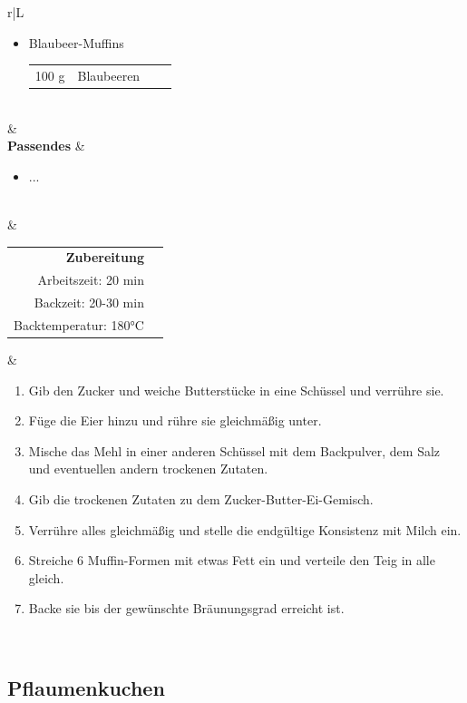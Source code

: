\documentclass[a4paper, 12pt]{scrbook} 								%
\numberwithin{equation}{section} 									%
\begin{document}
\begin{tabularx}{\textwidth}{r|L}
\begin{itemize}[]
											\item Blaubeer-Muffins
												\begin{tabular}{llll}
													100 g & Blaubeeren \\
												\end{tabular}
										\end{itemize} \\
									&	\\	
			\textbf{Passendes}		&	\begin{itemize}[]
											\item ...
										\end{itemize}	\\
									&	\\	
			\begin{tabular}[t]{rr}
				\textbf{Zubereitung}	\\
				Arbeitszeit: 20 min	\\
				Backzeit: 20-30 min		\\
				Backtemperatur: 180°C \\
			\end{tabular}			&	\begin{enumerate}[]
											\item Gib den Zucker und weiche Butterstücke in eine Schüssel und verrühre sie.
											\item Füge die Eier hinzu und rühre sie gleichmäßig unter.
											\item Mische das Mehl in einer anderen Schüssel mit dem Backpulver, dem Salz und eventuellen andern trockenen Zutaten.
											\item Gib die trockenen Zutaten zu dem Zucker-Butter-Ei-Gemisch.
											\item Verrühre alles gleichmäßig und stelle die endgültige Konsistenz mit Milch ein.
											\item Streiche 6 Muffin-Formen mit etwas Fett ein und verteile den Teig in alle gleich.
											\item Backe sie bis der gewünschte Bräunungsgrad erreicht ist.
										\end{enumerate}	\\
		\end{tabularx}
		\newpage



		\subsection{Pflaumenkuchen}	\label{pflaumenkuchen}
\end{document}
